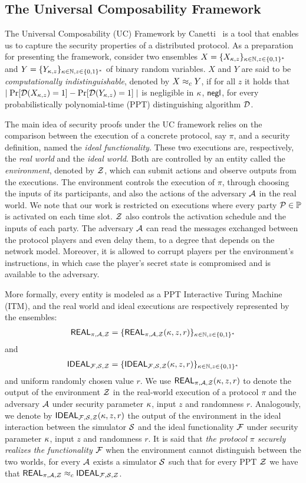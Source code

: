 \subsection{The Universal Composability Framework}

The Universal Composability (UC) Framework by Canetti~\cite{FOCS:Canetti01} is
a tool that enables us to capture the security properties of a distributed
protocol. As a preparation for presenting the framework, consider two ensembles
$X=\{X_{\kappa,z}\}_{\kappa \in {{\mathbb N}}, z\in\{0,1\}^*}$ and
$Y=\{Y_{\kappa,z}\}_{\kappa \in {{\mathbb N}}, z\in\{0,1\}^*}$ of binary random
variables. $X$ and $Y$ are said to be \emph{computationally indistinguishable},
denoted by $X \approx_c Y$, if for all $z$ it holds that $\mid
\Pr[\mathcal{D}(X_{\kappa,z})=1]-\Pr[\mathcal{D}(Y_{\kappa,z})=1]\mid$ is
negligible in $\kappa$, \ie $\mathsf{negl}$, for every probabilistically
polynomial-time (PPT) distinguishing algorithm $\mathcal{D}$.

The main idea of security proofs under the UC framework relies on the
comparison between the execution of a concrete protocol, say $\pi$, and a
security definition, named the \emph{ideal functionality}. These two executions
are, respectively, the \emph{real world} and the \emph{ideal world}. Both are
controlled by an entity called the \emph{environment}, denoted by $\mathcal{Z}$, which
can submit actions and observe outputs from the executions. The environment
controls the execution of $\pi$, through choosing the inputs of its
participants, and also the actions of the adversary $\mathcal{A}$ in the real world.
We note that our work is restricted on executions where every party $\mathcal{P} \in
\mathbb{P}$ is activated on each time slot. $\mathcal{Z}$ also controls the activation
schedule and the inputs of each party. The adversary $\mathcal{A}$ can read the
messages exchanged between the protocol players and even delay them, to a
degree that depends on the network model. Moreover, it is allowed to corrupt
players per the environment's instructions, in which case the player's secret
state is compromised and is available to the adversary.

More formally, every entity is modeled as a PPT Interactive Turing Machine
(ITM), and the real world and ideal executions are respectively represented by
the ensembles:
\begin{align*}
    {\mathsf{REAL}_{\pi, \mathcal{A}, \mathcal{Z}}}={\{\mathsf{REAL}_{\pi, \mathcal{A}, \mathcal{Z}}(\kappa,z,r)\}_{\kappa \in {{\mathbb N}},z \in \{0,1\}^{*}}}
\end{align*}
and
\begin{align*}
    {\mathsf{IDEAL}_{\ensuremath{\mathcal{F}}, \mathcal{S}, \mathcal{Z}}}={\{\mathsf{IDEAL}_{\mathcal{F}, \mathcal{S}, \mathcal{Z}}(\kappa,z,r)\}_{\kappa \in {{\mathbb N}}, z \in \{0,1\}^{*}}}
\end{align*}
and uniform randomly chosen value $r$. We use ${\mathsf{REAL}_{\pi, \mathcal{A}, \mathcal{Z}}}(\kappa,z,r)$ to denote
the output of the environment $\mathcal{Z}$ in the real-world execution of a protocol
$\pi$ and the adversary $\mathcal{A}$ under security parameter $\kappa$, input $z$
and randomness $r$. Analogously, we denote by ${\mathsf{IDEAL}_{\mathcal{F}, \mathcal{S}, \mathcal{Z}}}(\kappa,z,r)$ the
output of the environment in the ideal interaction between the simulator
$\mathcal{S}$ and the ideal functionality $\mathcal{F}$ under security parameter
$\kappa$, input $z$ and randomness $r$. It is said that \emph{the protocol
$\pi$ securely realizes the functionality $\mathcal{F}$} when the environment
cannot distinguish between the two worlds, \ie for every $\mathcal{A}$ exists a
simulator $\mathcal{S}$ such that for every PPT $\mathcal{Z}$ we have that
${\mathsf{REAL}_{\pi, \mathcal{A}, \mathcal{Z}}}\approx_c{\mathsf{IDEAL}_{\mathcal{F}, \mathcal{S}, \mathcal{Z}}}$.
